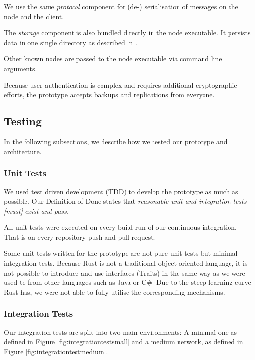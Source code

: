 We use the same \emph{protocol} component for (de-) serialisation of messages on the \gls{node} and the \gls{client}.

The \emph{storage} component is also bundled directly in the \gls{node} executable. It persists data in one single directory as described in .

Other known \glspl{node} are passed to the \gls{node} executable via command line arguments.

Because user authentication is complex and requires additional cryptographic efforts, the prototype accepts backups and replications from everyone.

\subsection{Testing}\label{testing}

In the following subsections, we describe how we tested our prototype and architecture.

\subsubsection{Unit Tests}\label{unit-tests}
We used test driven development (TDD) to develop the prototype as much as possible. Our Definition of Done\cite{project-plan} states that \emph{reasonable unit and integration tests [must] exist and pass.}

All unit tests were executed on every build run of our continuous integration. That is on every repository push and pull request.

Some unit tests written for the prototype are not pure unit tests but minimal integration tests. Because Rust is not a traditional object-oriented language, it is not possible to introduce and use interfaces (Traits) in the same way as we were used to from other languages such as Java or C\#. Due to the steep learning curve Rust has, we were not able to fully utilise the corresponding mechanisms.

\subsubsection{Integration Tests}\label{integration-tests}

Our integration tests are split into two main environments: A minimal one as defined in Figure \ref{fig:integrationtestsmall} and a medium network, as defined in Figure \ref{fig:integrationtestmedium}.


